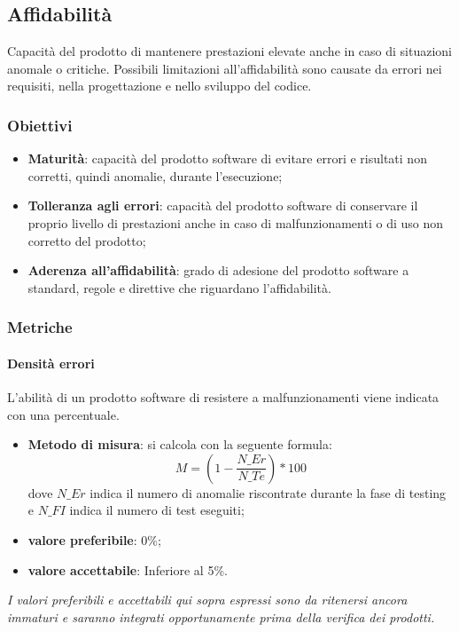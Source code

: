 \subsection{Affidabilità}
Capacità del prodotto di mantenere prestazioni elevate anche in caso di situazioni anomale o critiche.
Possibili limitazioni all’affidabilità sono causate da errori nei requisiti, nella progettazione e nello sviluppo del codice.

\subsubsection{Obiettivi}
\begin{itemize}
\item \textbf{Maturità}: capacità del prodotto software di evitare errori e risultati non corretti, quindi anomalie, durante l’esecuzione;
\item \textbf{Tolleranza agli errori}: capacità del prodotto software di conservare il proprio livello di prestazioni anche in caso di malfunzionamenti o di uso non corretto del prodotto;
\item \textbf{Aderenza all'affidabilità}: grado di adesione del prodotto software a standard, regole e direttive che riguardano l'affidabilità.
\end{itemize}

\subsubsection{Metriche}

\paragraph{Densità errori}
L'abilità di un prodotto software di resistere a malfunzionamenti viene indicata con una percentuale.
\begin{itemize}
\item \textbf{Metodo di misura}: si calcola con la seguente formula:
\[M = (1- \frac{N\_Er}{N\_Te}) * 100\]
dove $N\_Er$ indica il numero di anomalie riscontrate durante la fase di testing e $N\_FI$ indica il numero di test eseguiti;
\item \textbf{valore preferibile}: 0\%;
\item \textbf{valore accettabile}: Inferiore al 5\%.
\end{itemize}
\textit{I valori preferibili e accettabili qui sopra espressi sono da ritenersi ancora immaturi e saranno integrati opportunamente prima della verifica dei prodotti.}

